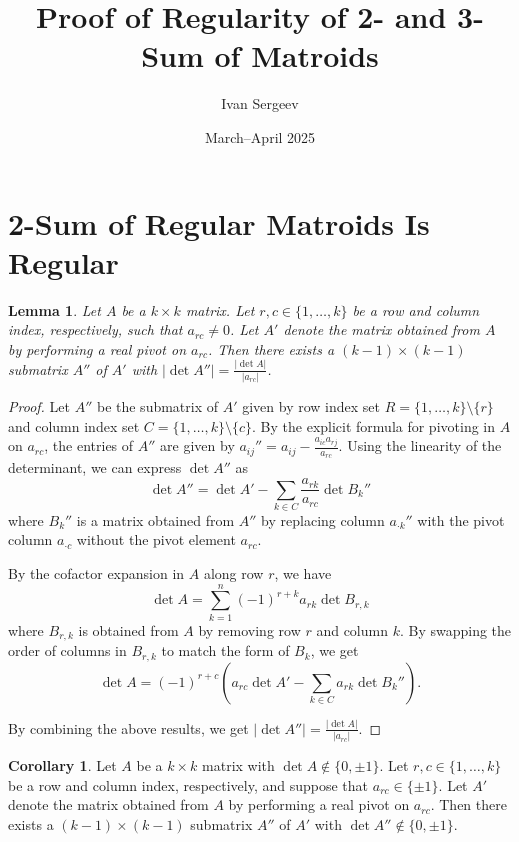 \documentclass{article}
\title{Proof of Regularity of 2- and 3-Sum of Matroids}
\author{Ivan Sergeev}
\date{March--April 2025}
\newtheorem{lemma}{Lemma}
\theoremstyle{definition}
\newtheorem{corollary}{Corollary}
\begin{document}
\maketitle

\section{2-Sum of Regular Matroids Is Regular}

\begin{lemma}\label{lem:pivot_submatrix_det}
    Let $A$ be a $k \times k$ matrix. Let $r, c \in \{1, \dots, k\}$ be a row and column index, respectively, such that $a_{rc} \neq 0$. Let $A'$ denote the matrix obtained from $A$ by performing a real pivot on $a_{rc}$. Then there exists a $(k - 1) \times (k - 1)$ submatrix $A''$ of $A'$ with $|\det A''| = \frac{|\det A|}{|a_{rc}|}$.
\end{lemma}

\begin{proof}
    Let $A''$ be the submatrix of $A'$ given by row index set $R = \{1, \dots, k\} \setminus \{r\}$ and column index set $C = \{1, \dots, k\} \setminus \{c\}$. By the explicit formula for pivoting in $A$ on $a_{rc}$, the entries of $A''$ are given by $a_{ij}'' = a_{ij} - \frac{a_{ic} a_{rj}}{a_{rc}}$. Using the linearity of the determinant, we can express $\det A''$ as
    \[
        \det A'' = \det A' - \sum_{k \in C} \frac{a_{rk}}{a_{rc}} \det B_{k}''
    \]
    where $B_{k}''$ is a matrix obtained from $A''$ by replacing column $a_{\cdot k}''$ with the pivot column $a_{\cdot c}$ without the pivot element $a_{rc}$.

    By the cofactor expansion in $A$ along row $r$, we have
    \[
        \det A = \sum_{k = 1}^{n} (-1)^{r + k} a_{rk} \det B_{r, k}
    \]
    where $B_{r, k}$ is obtained from $A$ by removing row $r$ and column $k$. By swapping the order of columns in $B_{r, k}$ to match the form of $B_{k}$, we get
    \[
        \det A = (-1)^{r + c} (a_{rc} \det A' - \sum_{k \in C} a_{rk} \det B_{k}'').
    \]

    By combining the above results, we get $|\det A''| = \frac{|\det A|}{|a_{rc}|}$.
\end{proof}

\begin{corollary}\label{cor:pivot_submatrix_det}
    Let $A$ be a $k \times k$ matrix with $\det A \notin \{0, \pm 1\}$. Let $r, c \in \{1, \dots, k\}$ be a row and column index, respectively, and suppose that $a_{rc} \in \{\pm 1\}$. Let $A'$ denote the matrix obtained from $A$ by performing a real pivot on $a_{rc}$. Then there exists a $(k - 1) \times (k - 1)$ submatrix $A''$ of $A'$ with $\det A'' \notin \{0, \pm 1\}$.
\end{corollary}
\end{document}
